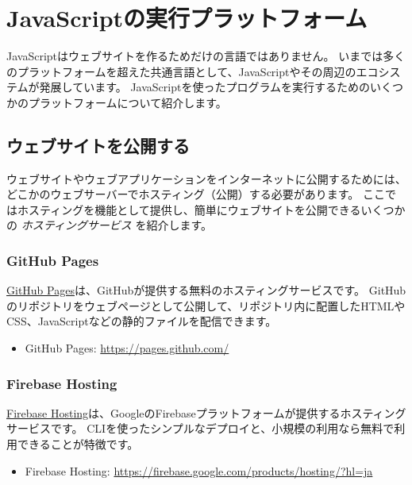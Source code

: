 \hypertarget{javascript-platform}{%
\section{JavaScriptの実行プラットフォーム}\label{javascript-platform}}

JavaScriptはウェブサイトを作るためだけの言語ではありません。
いまでは多くのプラットフォームを超えた共通言語として、JavaScriptやその周辺のエコシステムが発展しています。
JavaScriptを使ったプログラムを実行するためのいくつかのプラットフォームについて紹介します。

\hypertarget{publishing-website}{%
\subsection{ウェブサイトを公開する}\label{publishing-website}}

ウェブサイトやウェブアプリケーションをインターネットに公開するためには、どこかのウェブサーバーでホスティング（公開）する必要があります。
ここではホスティングを機能として提供し、簡単にウェブサイトを公開できるいくつかの
\emph{ホスティングサービス} を紹介します。

\hypertarget{github-pages}{%
\subsubsection{GitHub Pages}\label{github-pages}}

\href{https://pages.github.com/}{GitHub
Pages}は、GitHubが提供する無料のホスティングサービスです。
GitHubのリポジトリをウェブページとして公開して、リポジトリ内に配置したHTMLやCSS、JavaScriptなどの静的ファイルを配信できます。
\begin{itemize}
\item GitHub Pages: \url{https://pages.github.com/}
\end{itemize}

\hypertarget{firebase-hosting}{%
\subsubsection{Firebase Hosting}\label{firebase-hosting}}

\href{https://firebase.google.com/products/hosting/?hl=ja}{Firebase
Hosting}は、GoogleのFirebaseプラットフォームが提供するホスティングサービスです。
CLIを使ったシンプルなデプロイと、小規模の利用なら無料で利用できることが特徴です。
\begin{itemize}
\item Firebase Hosting: \url{https://firebase.google.com/products/hosting/?hl=ja}
\end{itemize}

